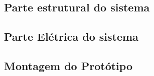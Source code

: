 \subsection{ Parte estrutural do sistema}




\subsection{Parte Elétrica do sistema}




\subsection{Montagem do Protótipo}